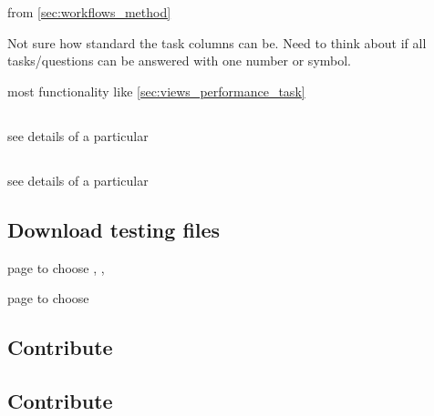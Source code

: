 from \cref{sec:workflows_method}

Not sure how standard the task columns can be.
Need to think about if all tasks/questions can be answered with one number or symbol.

most functionality like \cref{sec:views_performance_task}

\subsection{\Element}

see details of a particular \Element

\subsection{\Method}

see details of a particular \Method

\subsection{Download testing files}

page to choose \Elements, \Refsets, \Benchmark

page to choose \Methods

\subsection{Contribute \Element}

\subsection{Contribute \Method}
